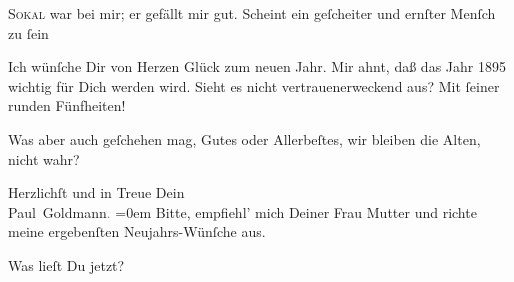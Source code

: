 \pstart
           {\pb}\textsc{Sokal} war bei mir; er gefällt mir gut. Scheint ein geſcheiter und ernſter Menſch zu{ }ſein{\dotsfour}\pend
           
\pstart
           Ich wünſche Dir von Herzen Glück zum neuen Jahr. Mir ahnt, daß das Jahr
                  1895 wichtig für Dich werden wird. Sieht es nicht vertrauenerweckend
               aus? Mit{ }ſeiner runden Fünfheiten!\pend
           
\pstart
           Was aber auch geſchehen mag, Gutes oder Allerbeſtes, wir bleiben die Alten, nicht
               wahr?\pend
           
\pstart
           Herzlichſt und in Treue Dein{\\[\baselineskip]}\spacefill\mbox{Paul Goldmann\textcolor{gray}{.}}\pend
           \leftskip=0em{}
\pstart
           \noindent{}{\pb}Bitte, empfiehl’ mich Deiner Frau Mutter und richte \label{T_L02630-1v}\label{T_L02630-1} meine ergebenſten Neujahrs-Wünſche aus.\pend
           
\pstart
           Was lieſt Du jetzt?\pend
           \endnumbering{}  \newcommand{\dateiname}{L02630}\newcommand{\titel}{Paul Goldmann an Arthur Schnitzler, 31. 12. [1894]}\newcommand{\editorInnen}{Martin Anton Müller und Laura Untner}
